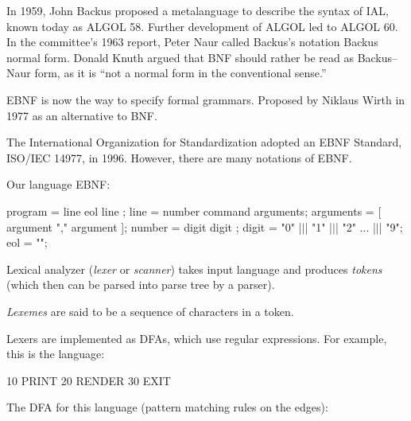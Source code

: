 \documentclass{article}
\begin{document}

\pptToc


In 1959, John Backus proposed a metalanguage to describe the syntax of IAL, known today as ALGOL 58. Further development of ALGOL led to ALGOL 60. In the committee's 1963 report, Peter Naur called Backus's notation Backus normal form. Donald Knuth argued that BNF should rather be read as Backus–Naur form, as it is ``not a normal form in the conventional sense.''

EBNF is now the way to specify formal grammars. Proposed by Niklaus Wirth in 1977 as an alternative to BNF.

The International Organization for Standardization adopted an EBNF Standard, ISO/IEC 14977, in 1996. However, there are many notations of EBNF.
\plush{}

Our language EBNF:
\begin{ffcode}
program = line { eol line };
line = number command arguments;
arguments = [ argument { "," argument } ];
number = digit { digit };
digit = "0" |$\vert$| "1" |$\vert$| "2" ... |$\vert$| "9";
eol = "\n";
\end{ffcode}
\plush{}


Lexical analyzer (\emph{lexer} or \emph{scanner}) takes input language and produces \emph{tokens} (which then can be parsed into parse tree by a parser).

\emph{Lexemes} are said to be a sequence of characters in a token.
\plush{}

Lexers are implemented as DFAs, which use regular expressions. For example, this is the language:
\begin{ffcode}
10 PRINT
20 RENDER
30 EXIT
\end{ffcode}
\plush{}

The DFA for this language (pattern matching rules on the edges): \\
\end{document}
